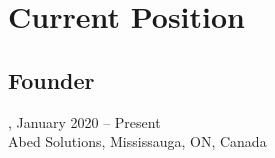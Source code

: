 \section{Current Position}
\subsection{Founder}, January 2020 -- Present\\
Abed Solutions, Mississauga, ON, Canada

